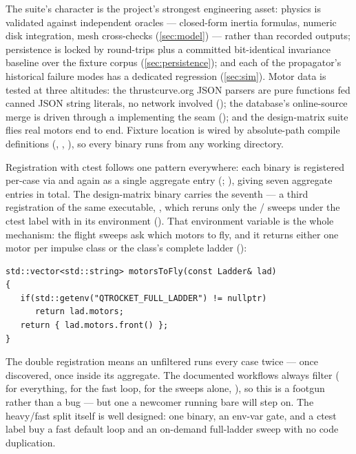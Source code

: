 The suite's character is the project's strongest engineering asset: physics is validated
against independent oracles --- closed-form inertia formulas, numeric disk integration, mesh
cross-checks (\cref{sec:model}) --- rather than recorded outputs; persistence is locked by
round-trips plus a committed bit-identical invariance baseline over the fixture corpus
(\cref{sec:persistence}); and each of the propagator's historical failure modes has a
dedicated regression (\cref{sec:sim}). Motor data is tested at three altitudes: the
thrustcurve.org JSON parsers are pure functions fed canned JSON string literals, no network
involved (); the database's online-source
merge is driven through a  implementing the
 seam (); and
the design-matrix suite flies real motors end to end. Fixture location is wired by
absolute-path compile definitions (,
, ), so every binary runs from
any working directory.

Registration with ctest follows one pattern everywhere: each binary is registered per-case
via  and again as a single aggregate  entry
(; ), giving seven
aggregate entries in total. The design-matrix binary carries the seventh --- a third
registration of the same executable, , which
reruns only the / sweeps under the ctest label
 with  in its environment
(). That environment variable is the whole mechanism: the
flight sweeps ask  which motors to fly, and it returns either one motor
per impulse class or the class's complete ladder ():

\begin{verbatim}
std::vector<std::string> motorsToFly(const Ladder& lad)
{
   if(std::getenv("QTROCKET_FULL_LADDER") != nullptr)
      return lad.motors;
   return { lad.motors.front() };
}
\end{verbatim}

\begin{keyinsight}
The double registration means an unfiltered  runs every case twice --- once
discovered, once inside its aggregate. The documented workflows always filter
( for everything,  for the fast loop, 
for the sweeps alone, ), so this is a footgun rather than a
bug --- but one a newcomer running bare  will step on. The heavy/fast split
itself is well designed: one binary, an env-var gate, and a ctest label buy a fast default
loop and an on-demand full-ladder sweep with no code duplication.
\end{keyinsight}

